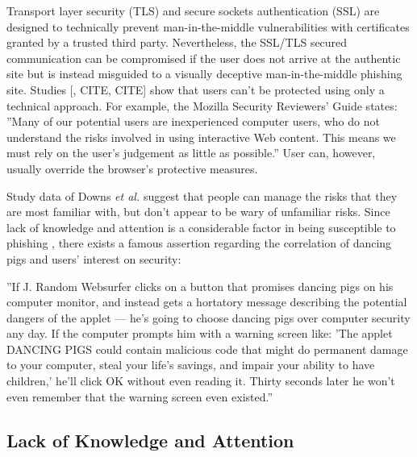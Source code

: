 \documentclass{tktltiki}
\begin{document}
    Transport layer security (TLS) and secure sockets authentication (SSL) are designed to technically prevent man-in-the-middle vulnerabilities with certificates granted by a trusted third party. Nevertheless, the SSL/TLS secured communication can be compromised if the user does not arrive at the authentic site but is instead misguided to a visually deceptive man-in-the-middle phishing site. Studies \cite{why_phishing_works_06, suspectibility_to_phishing_2006}[, CITE, CITE] show that users can't be protected using only a technical approach. For example, the Mozilla Security Reviewers' Guide \cite{mozilla_security_guide_2010} states: ''Many of our potential users are inexperienced computer users, who do not understand the risks involved in using interactive Web content. This means we must rely on the user's judgement as little as possible.'' User can, however, usually override the browser's protective measures.

    Study data of Downs \emph{et al.} \cite{suspectibility_to_phishing_2006} suggest that people can manage the risks that they are most familiar with, but don't appear to be wary of unfamiliar risks. Since lack of knowledge and attention is a considerable factor in being susceptible to phishing \cite{why_phishing_works_06}, there exists a famous assertion regarding the correlation of dancing pigs and users' interest on security:

    ''If J. Random Websurfer clicks on a button that promises dancing pigs on his computer monitor, and instead gets a hortatory message describing the potential dangers of the applet — he's going to choose dancing pigs over computer security any day. If the computer prompts him with a warning screen like: 'The applet DANCING PIGS could contain malicious code that might do permanent damage to your computer, steal your life's savings, and impair your ability to have children,' he'll click OK without even reading it. Thirty seconds later he won't even remember that the warning screen even existed.''\cite{schneier_secrets_and_lies_2000}

          

      
    
\subsection{Lack of Knowledge and Attention}
\end{document}
